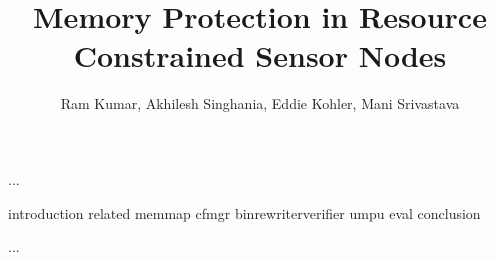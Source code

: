 \documentclass[acmtecs,acmnow]{acmtrans2m}
\title{Memory Protection in Resource Constrained Sensor Nodes}
\author{Ram Kumar, Akhilesh Singhania, Eddie Kohler, Mani Srivastava}
\begin{document}
            
\begin{bottomstuff} 
...
\end{bottomstuff}
            
\maketitle


 {introduction}
 {related}
 {memmap}
 {cfmgr}
 {binrewriterverifier}
 {umpu}
 {eval}
 {conclusion}






\begin{received}
...
\end{received}
\end{document}
